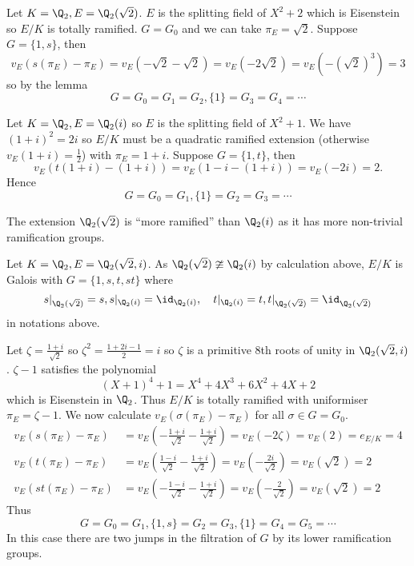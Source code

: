 \documentclass[a4paper]{article}
\begin{document}
\begin{eg}
  Let \(K = \Q_2, E = \Q_2(\sqrt 2)\). \(E\) is the splitting field of \(X^2 + 2\) which is Eisenstein so \(E/K\) is totally ramified. \(G = G_0\) and we can take \(\pi_E = \sqrt 2\). Suppose \(G = \{1, s\}\), then
  \[
    v_E(s(\pi_E) - \pi_E) = v_E(-\sqrt 2 - \sqrt 2) = v_E( -2 \sqrt 2) = v_E(-(\sqrt 2)^3) = 3
  \]
  so by the lemma
  \[
    G = G_0 = G_1 = G_2, \{1\} = G_3 = G_4 = \cdots
  \]
\end{eg}

\begin{eg}
  Let \(K = \Q_2, E = \Q_2(i)\) so \(E\) is the splitting field of \(X^2 + 1\). We have \((1 + i)^2 = 2i\) so \(E/K\) must be a quadratic ramified extension (otherwise \(v_E(1 + i) = \frac{1}{2}\)) with \(\pi_E = 1 + i\). Suppose \(G = \{1, t\}\), then
  \[
    v_E(t(1 + i) - (1 + i)) = v_E(1- i - (1 + i)) = v_E(-2i) = 2.
  \]
  Hence
  \[
    G = G_0 = G_1, \{1\} = G_2 = G_3 = \cdots
  \]

  The extension \(\Q_2(\sqrt 2)\) is ``more ramified'' than \(\Q_2(i)\) as it has more non-trivial ramification groups.
\end{eg}

\begin{eg}
  Let \(K = \Q_2, E = \Q_2(\sqrt 2, i)\). As \(\Q_2(\sqrt 2) \ncong \Q_2(i)\) by calculation above, \(E/K\) is Galois with \(G = \{1, s, t, st\}\) where
  \[
    s|_{\Q_2(\sqrt 2)} = s, s|_{\Q_2(i)} = \id_{\Q_2(i)}, \quad
    t|_{\Q_2(i)} = t, t|_{\Q_2(\sqrt 2)} = \id_{\Q_2(\sqrt 2)}
  \]
  in notations above.

  Let \(\zeta = \frac{1 + i}{\sqrt 2}\) so \(\zeta^2 = \frac{1 + 2i - 1}{2} = i\) so \(\zeta\) is a primitive \(8\)th roots of unity in \(\Q_2(\sqrt 2, i)\). \(\zeta - 1\) satisfies the polynomial
  \[
    (X + 1)^4 + 1 = X^4 + 4X^3 + 6X^2 + 4X + 2
  \]
  which is Eisenstein in \(\Q_2\). Thus \(E/K\) is totally ramified with uniformiser \(\pi_E = \zeta - 1\). We now calculate \(v_E(\sigma(\pi_E) - \pi_E)\) for all \(\sigma \in G = G_0\).
  \begin{align*}
    v_E(s(\pi_E) - \pi_E) &= v_E(- \frac{1 + i}{\sqrt 2} - \frac{1 + i}{\sqrt 2}) = v_E(-2\zeta) = v_E(2) = e_{E/K} = 4 \\
    v_E(t(\pi_E) - \pi_E) &= v_E( \frac{1 - i}{\sqrt 2} - \frac{1 + i}{\sqrt 2}) = v_E(- \frac{2i}{\sqrt 2}) = v_E(\sqrt 2) = 2 \\
    v_E(st(\pi_E) - \pi_E) &= v_E(-\frac{1 - i}{\sqrt 2} - \frac{1 + i}{\sqrt 2}) = v_E(-\frac{2}{\sqrt 2}) = v_E(\sqrt 2) = 2
  \end{align*}
  Thus
  \[
    G = G_0 = G_1, \{1, s\} = G_2 = G_3, \{1\} = G_4 = G_5 = \cdots
  \]
  In this case there are two jumps in the filtration of \(G\) by its lower ramification groups.
\end{eg}
\end{document}
